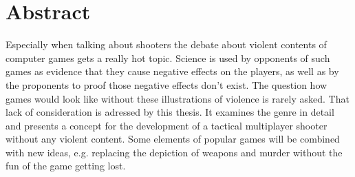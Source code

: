 \chapter*{Abstract}

Especially when talking about shooters the debate about violent contents of computer games gets a really hot topic.
Science is used by opponents of such games as evidence that they cause negative effects on the players, as well as by
the proponents to proof those negative effects don't exist. The question how games would look like without these
illustrations of violence is rarely asked. That lack of consideration is adressed by this thesis. It examines the genre
in detail and presents a concept for the development of a tactical multiplayer shooter without any violent content. Some
elements of popular games will be combined with new ideas, e.g. replacing the depiction of weapons and murder without
the fun of the game getting lost.
